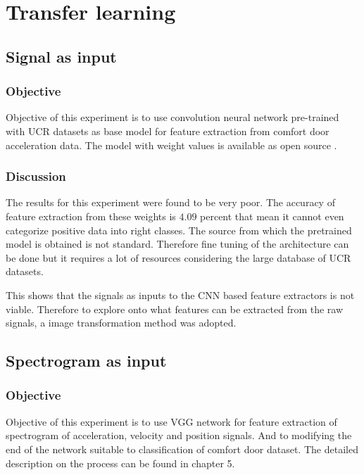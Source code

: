    
   \chapter{Transfer learning}
   
   \section{Signal as input}
   
   \subsection{Objective}
   
   Objective of this experiment is to use convolution neural network pre-trained with UCR datasets as base model for feature extraction from comfort door acceleration data. The model with weight values is available as open source \cite{fawaz2018transfer}.
   
   \subsection{Discussion}
   The results for this experiment were found to be very poor. The accuracy of feature extraction from these weights is $4.09$ percent that mean it cannot even categorize positive data into right classes. The source from which the pretrained model is obtained is not standard. Therefore fine tuning of the architecture can be done but it requires a lot of resources considering the large database of UCR datasets. 
   
   This shows that the signals as inputs to the CNN based feature extractors is not viable. Therefore to explore onto what features can be extracted from the raw signals, a image transformation method was adopted.
   
    \section{Spectrogram as input}
    
    \subsection{Objective}
    
    Objective of this experiment is to use VGG network for feature extraction of spectrogram of acceleration, velocity and position signals. And to modifying the end of the network suitable to classification of comfort door dataset. 
    The detailed description on the process can be found in chapter 5.
    

